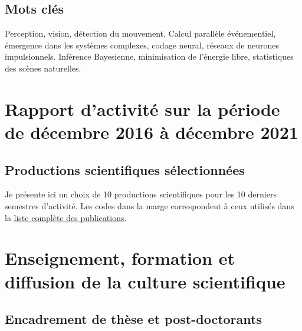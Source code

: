 \documentclass[10pt,french,a4paper,oneside]{article}%
\begin{document}
\subsection*{Mots clés}
Perception, vision, détection du mouvement. Calcul parallèle événementiel, émergence dans les systèmes complexes, codage neural, réseaux de neurones impulsionnels. Inférence Bayesienne, minimisation de l'énergie libre, statistiques des scènes naturelles.

\newpage
\section{Rapport d’activité sur la période de décembre 2016 à décembre 2021} %



\newpage
\subsection{Productions scientifiques sélectionnées}

Je présente ici un choix de 10 productions scientifiques pour les 10 derniers
semestres d’activité. Les codes dans la marge correspondent à ceux utilisés dans la \href{https://raw.githubusercontent.com/laurentperrinet/perrinet_curriculum-vitae.tex/master/perrinet_publications.pdf}{liste complète des publications}.



\newpage
\section{Enseignement, formation et diffusion de la culture scientifique}

\subsection{Encadrement de thèse et post-doctorants} %

%
%
\end{document}
